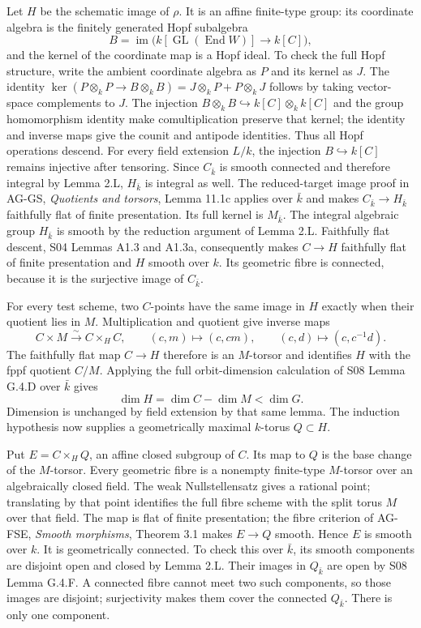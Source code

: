\documentclass[11pt,a4paper,openany]{report}
\newcounter{none}
\begin{document}
Let \(H\) be the schematic image of \(\rho\). It is an affine finite-type group: its coordinate algebra is the finitely generated Hopf subalgebra \[
 B=\operatorname{im}\bigl(k[\operatorname{GL}(\operatorname{End}W)]\longrightarrow k[C]\bigr),
\] and the kernel of the coordinate map is a Hopf ideal. To check the full Hopf structure, write the ambient coordinate algebra as \(P\) and its kernel as \(J\). The identity \(\ker(P\otimes_k P\to B\otimes_k B)=J\otimes_k P+P\otimes_k J\) follows by taking vector-space complements to \(J\). The injection \(B\otimes_k B\hookrightarrow k[C]\otimes_k k[C]\) and the group homomorphism identity make comultiplication preserve that kernel; the identity and inverse maps give the counit and antipode identities. Thus all Hopf operations descend. For every field extension \(L/k\), the injection \(B\hookrightarrow k[C]\) remains injective after tensoring. Since \(C_{\bar k}\) is smooth connected and therefore integral by Lemma 2.L, \(H_{\bar k}\) is integral as well. The reduced-target image proof in AG-GS, \emph{Quotients and torsors}, Lemma 11.1c applies over \(\bar k\) and makes \(C_{\bar k}\to H_{\bar k}\) faithfully flat of finite presentation. Its full kernel is \(M_{\bar k}\). The integral algebraic group \(H_{\bar k}\) is smooth by the reduction argument of Lemma 2.L. Faithfully flat descent, S04 Lemmas A1.3 and A1.3a, consequently makes \(C\to H\) faithfully flat of finite presentation and \(H\) smooth over \(k\). Its geometric fibre is connected, because it is the surjective image of \(C_{\bar k}\).

For every test scheme, two \(C\)-points have the same image in \(H\) exactly when their quotient lies in \(M\). Multiplication and quotient give inverse maps \[
 C\times M\xrightarrow{\sim}C\times_H C,
 \qquad(c,m)\longmapsto(c,cm),\qquad
 (c,d)\longmapsto(c,c^{-1}d).
\] The faithfully flat map \(C\to H\) therefore is an \(M\)-torsor and identifies \(H\) with the fppf quotient \(C/M\). Applying the full orbit-dimension calculation of S08 Lemma G.4.D over \(\bar k\) gives \[
 \dim H=\dim C-\dim M<\dim G.
\] Dimension is unchanged by field extension by that same lemma. The induction hypothesis now supplies a geometrically maximal \(k\)-torus \(Q\subset H\).

Put \(E=C\times_H Q\), an affine closed subgroup of \(C\). Its map to \(Q\) is the base change of the \(M\)-torsor. Every geometric fibre is a nonempty finite-type \(M\)-torsor over an algebraically closed field. The weak Nullstellensatz gives a rational point; translating by that point identifies the full fibre scheme with the split torus \(M\) over that field. The map is flat of finite presentation; the fibre criterion of AG-FSE, \emph{Smooth morphisms}, Theorem 3.1 makes \(E\to Q\) smooth. Hence \(E\) is smooth over \(k\). It is geometrically connected. To check this over \(\bar k\), its smooth components are disjoint open and closed by Lemma 2.L. Their images in \(Q_{\bar k}\) are open by S08 Lemma G.4.F. A connected fibre cannot meet two such components, so those images are disjoint; surjectivity makes them cover the connected \(Q_{\bar k}\). There is only one component.
\end{document}
